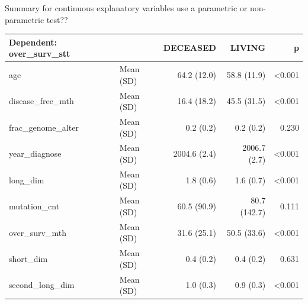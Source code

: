 \documentclass[]{article}
\newenvironment{Shaded}{\begin{snugshade}}{\end{snugshade}}
\newcommand{\KeywordTok}[1]{\textcolor[rgb]{0.13,0.29,0.53}{\textbf{#1}}}
\newcommand{\DataTypeTok}[1]{\textcolor[rgb]{0.13,0.29,0.53}{#1}}
\newcommand{\StringTok}[1]{\textcolor[rgb]{0.31,0.60,0.02}{#1}}
\newcommand{\OtherTok}[1]{\textcolor[rgb]{0.56,0.35,0.01}{#1}}
\newcommand{\OperatorTok}[1]{\textcolor[rgb]{0.81,0.36,0.00}{\textbf{#1}}}
\newcommand{\NormalTok}[1]{#1}
\begin{document}
Summary for continuous explanatory variables use a parametric or
non-parametric test??

\begin{Shaded}
\end{Shaded}

\begin{longtable}[]{@{}llrrr@{}}
\toprule
Dependent: over\_surv\_stt & & DECEASED & LIVING & p\tabularnewline
\midrule
\endhead
age & Mean (SD) & 64.2 (12.0) & 58.8 (11.9) &
\textless{}0.001\tabularnewline
disease\_free\_mth & Mean (SD) & 16.4 (18.2) & 45.5 (31.5) &
\textless{}0.001\tabularnewline
frac\_genome\_alter & Mean (SD) & 0.2 (0.2) & 0.2 (0.2) &
0.230\tabularnewline
year\_diagnose & Mean (SD) & 2004.6 (2.4) & 2006.7 (2.7) &
\textless{}0.001\tabularnewline
long\_dim & Mean (SD) & 1.8 (0.6) & 1.6 (0.7) &
\textless{}0.001\tabularnewline
mutation\_cnt & Mean (SD) & 60.5 (90.9) & 80.7 (142.7) &
0.111\tabularnewline
over\_surv\_mth & Mean (SD) & 31.6 (25.1) & 50.5 (33.6) &
\textless{}0.001\tabularnewline
short\_dim & Mean (SD) & 0.4 (0.2) & 0.4 (0.2) & 0.631\tabularnewline
second\_long\_dim & Mean (SD) & 1.0 (0.3) & 0.9 (0.3) &
\textless{}0.001\tabularnewline
\bottomrule
\end{longtable}
\end{document}
